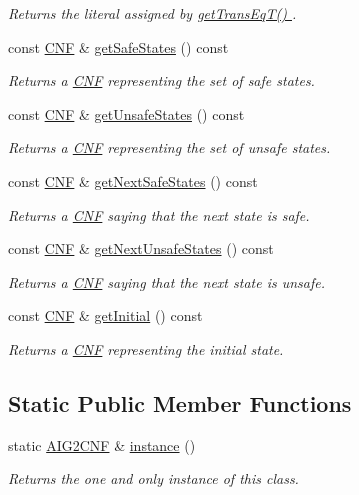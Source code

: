 \begin{DoxyCompactItemize}
\begin{DoxyCompactList}\small\item\em Returns the literal assigned by \hyperlink{classAIG2CNF_add8899c00619a3c182e78d21b988d748}{get\-Trans\-Eq\-T() }. \end{DoxyCompactList}\item 
const \hyperlink{classCNF}{C\-N\-F} \& \hyperlink{classAIG2CNF_ac71ea2d9f9280c8bb3d20d109e892e2d}{get\-Safe\-States} () const 
\begin{DoxyCompactList}\small\item\em Returns a \hyperlink{classCNF}{C\-N\-F} representing the set of safe states. \end{DoxyCompactList}\item 
const \hyperlink{classCNF}{C\-N\-F} \& \hyperlink{classAIG2CNF_a7e6e6af6ac83605669918008b12d30e7}{get\-Unsafe\-States} () const 
\begin{DoxyCompactList}\small\item\em Returns a \hyperlink{classCNF}{C\-N\-F} representing the set of unsafe states. \end{DoxyCompactList}\item 
const \hyperlink{classCNF}{C\-N\-F} \& \hyperlink{classAIG2CNF_af04a7275b64d96d7c16c5c8c8668b93c}{get\-Next\-Safe\-States} () const 
\begin{DoxyCompactList}\small\item\em Returns a \hyperlink{classCNF}{C\-N\-F} saying that the next state is safe. \end{DoxyCompactList}\item 
const \hyperlink{classCNF}{C\-N\-F} \& \hyperlink{classAIG2CNF_a1bec5428f2f5f6efa41810a308ebbe1f}{get\-Next\-Unsafe\-States} () const 
\begin{DoxyCompactList}\small\item\em Returns a \hyperlink{classCNF}{C\-N\-F} saying that the next state is unsafe. \end{DoxyCompactList}\item 
const \hyperlink{classCNF}{C\-N\-F} \& \hyperlink{classAIG2CNF_ae20be327c24ca3ed7493b56a254d6a63}{get\-Initial} () const 
\begin{DoxyCompactList}\small\item\em Returns a \hyperlink{classCNF}{C\-N\-F} representing the initial state. \end{DoxyCompactList}\end{DoxyCompactItemize}
\subsection*{Static Public Member Functions}
\begin{DoxyCompactItemize}
\item 
static \hyperlink{classAIG2CNF}{A\-I\-G2\-C\-N\-F} \& \hyperlink{classAIG2CNF_a7a4db833018cb851ab608004b4e651e4}{instance} ()
\begin{DoxyCompactList}\small\item\em Returns the one and only instance of this class. \end{DoxyCompactList}\end{DoxyCompactItemize}
